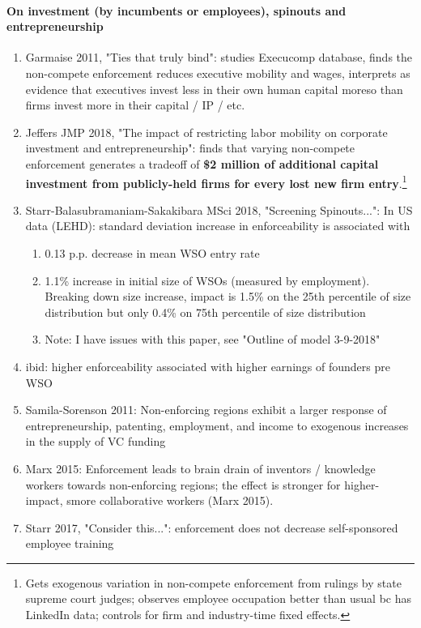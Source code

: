\documentclass[12pt,english]{article}
\theoremstyle{remark}
\begin{document}
\paragraph{On investment (by incumbents or employees), spinouts and entrepreneurship}
\begin{enumerate}
	\item Garmaise 2011, "Ties that truly bind": studies Execucomp database, finds the non-compete enforcement reduces executive mobility and wages, interprets as evidence that executives invest less in their own human capital moreso than firms invest more in their capital / IP / etc.
	\item Jeffers JMP 2018, "The impact of restricting labor mobility on corporate investment and entrepreneurship": finds that varying non-compete enforcement generates a tradeoff of \textbf{\$2 million of additional capital investment from publicly-held firms for every lost new firm entry}.\footnote{Gets exogenous variation in non-compete enforcement from rulings by state supreme court judges; observes employee occupation better than usual bc has LinkedIn data; controls for firm and industry-time fixed effects.}
	\item Starr-Balasubramaniam-Sakakibara MSci 2018, "Screening Spinouts...": In US data (LEHD): standard deviation increase in enforceability is associated with
	\begin{enumerate}
		\item 0.13 p.p. decrease in mean WSO entry rate 
		\item 1.1\% increase in initial size of WSOs (measured by employment). Breaking down size increase, impact is 1.5\% on the 25th percentile of size distribution but only 0.4\% on 75th percentile of size distribution 
		\item Note: I have issues with this paper, see "Outline of model 3-9-2018"
	\end{enumerate}
	\item ibid:  higher enforceability associated with higher earnings of founders pre WSO
	\item Samila-Sorenson 2011: Non-enforcing regions exhibit a larger response of entrepreneurship, patenting, employment, and income to exogenous increases in the supply
	of VC funding
	\item Marx 2015: Enforcement leads to brain drain of inventors / knowledge workers towards non-enforcing regions; the effect is stronger
	for higher-impact, smore collaborative workers (Marx 2015).
	\item Starr 2017, "Consider this...": enforcement does not decrease self-sponsored employee training
\end{enumerate}
\end{document}
